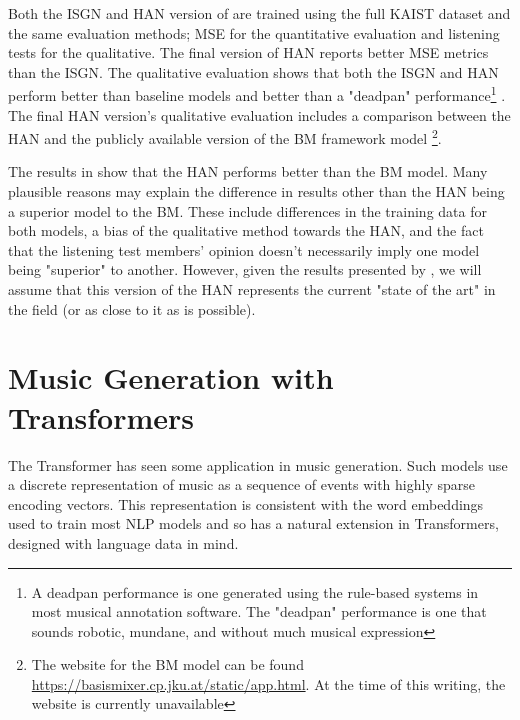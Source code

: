 Both the ISGN\cite{jeong2019graph} and HAN\cite{jeong2019virtuosonet} version of \vnet{} are trained using the full KAIST dataset and the same evaluation methods; MSE for the quantitative evaluation and listening tests for the qualitative. The final version of HAN reports better MSE metrics than the ISGN. The qualitative evaluation shows that both the ISGN and HAN perform better than baseline models and better than a "deadpan" performance\footnote{A deadpan performance is one generated using the rule-based systems in most musical annotation software. The "deadpan" performance is one that sounds robotic, mundane, and without much musical expression} . The final HAN version's qualitative evaluation includes a comparison between the HAN and the publicly available version of the BM framework model \footnote{The website for the BM model can be found \href{here}{https://basismixer.cp.jku.at/static/app.html}. At the time of this writing, the website is currently unavailable}. 

The results in \cite{jeong2019virtuosonet} show that the HAN performs better than the BM model. Many plausible reasons may explain the difference in results other than the HAN being a superior model to the BM. These include differences in the training data for both models, a bias of the qualitative method towards the HAN, and the fact that the listening test members' opinion doesn't necessarily imply one model being "superior" to another. However, given the results presented by \citet{jeong2019virtuosonet}, we will assume that this version of the HAN represents the current "state of the art" in the field (or as close to it as is possible). 


\section{Music Generation with Transformers}
The Transformer has seen some application in music generation. Such models use a discrete representation of music as a sequence of events with highly sparse encoding vectors. This representation is consistent with the word embeddings used to train most NLP models and so has a natural extension in Transformers, designed with language data in mind. 

